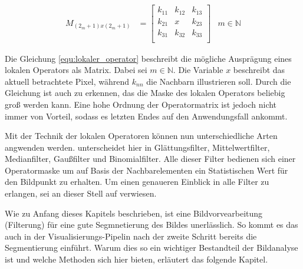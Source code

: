 \begin{align}
	\label{equ:lokaler_operator}M_{(2_m+1)x(2_m+1)} & = \begin{bmatrix}k_{11}&k_{12}&k_{13}\\ k_{21}&x&k_{23}\\ k_{31}&k_{32}&k_{33}\\\end{bmatrix} & m \in \mathbb{N}
\end{align}

Die Gleichung \ref{equ:lokaler_operator} beschreibt die mögliche Ausprägung
eines lokalen Operators als Matrix. Dabei sei $m \in \mathbb{N}$. Die Variable
$x$ beschreibt das aktuell betrachtete Pixel, während $k_{nn}$ die Nachbarn illustrieren
soll. Durch die Gleichung ist auch zu erkennen, das die Maske des lokalen Operators
beliebig groß werden kann. Eine hohe Ordnung der Operatormatrix ist jedoch nicht
immer von Vorteil, sodass es letzten Endes auf den Anwendungsfall ankommt.

Mit der Technik der lokalen Operatoren können nun unterschiedliche Arten angwenden
werden. \citet[Seite 54 - 55]{handels2000} unterscheidet hier in Glättungsfilter,
Mittelwertfilter, Medianfilter, Gaußfilter und Binomialfilter. Alle dieser
Filter bedienen sich einer Operatormaske um auf Basis der Nachbarelementen ein
Statistischen Wert für den Bildpunkt zu erhalten. Um einen genaueren Einblick in
alle Filter zu erlangen, sei an dieser Stell auf \citet[Seite 54 - 55]{handels2000}
verwiesen.

Wie zu Anfang dieses Kapitels beschrieben, ist eine Bildvorvearbeitung (Filterung)
für eine gute Segmnetierung des Bildes unerlässlich. So kommt es das auch in der
Visualisierungs-Pipelin nach \citet[Seite 50]{handels2000} der zweite Schritt
bereits die Segmentierung einführt. Warum dies so ein wichtiger Bestandteil der Bildanalyse
ist und welche Methoden sich hier bieten, erläutert das folgende Kapitel.

\pagebreak

